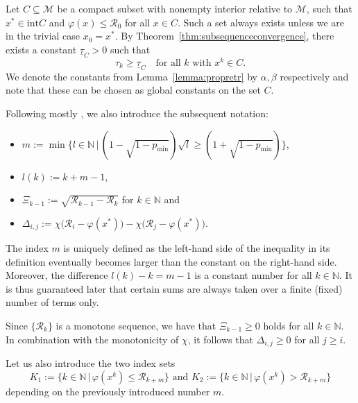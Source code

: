 \documentclass[a4paper, 12pt]{article}
\numberwithin{equation}{section}
\theoremstyle{bolddef}
\theoremstyle{definition}
\theoremstyle{boldplain}
\newcommand{\xk}{x^k}
\newcommand{\tauk}{\tau_k}
\newcommand{\taug}{\underline{\tau}}
\newcommand{\N}{\mathbb{N}}
\newcommand{\Rvalue}{\mathcal{R}}
\begin{document}
Let $C \subseteq \mathcal{M}$ be a compact subset with nonempty interior relative to $\mathcal{M}$, such that $x^* \in \mathrm{int} C$ and $\varphi(x) \leq \Rvalue_0$ for all $x \in C$. Such a set always exists unless we are in the trivial case $x_0 = x^*$. By Theorem~\ref{thm:subsequenceconvergence}, there exists a constant $\taug_C > 0$ 
such that 
\begin{equation}\label{eq:taucbounded}
   \tauk \geq \taug_C \quad \text{for all } k
   \text{ with } \xk \in C.
\end{equation}
We denote the constants from Lemma~\ref{lemma:propretr} by $\alpha, \beta$ respectively and note that these can be chosen as global constants on the set $C$.

Following mostly \cite{Qian2024}, we also introduce
the subsequent notation: 
\begin{itemize}
	\item $m := \min \big\{ l \in \N \, \big| \, (1-\sqrt{1-p_{\min}}) \sqrt{l} \geq (1+\sqrt{1-p_{\min}}) \big\} $,
	\item $l(k) := k + m - 1$, 
	\item $\Xi_{k-1} := \sqrt{\Rvalue_{k-1} - \Rvalue_{k}}$ for $k \in \N $
	   and
	\item $\Delta_{i, j} := \chi \big(\Rvalue_i- \varphi(x^*) \big) - 
	   \chi \big( \Rvalue_j - \varphi(x^*) \big)$.
\end{itemize}
The index $m$ is uniquely defined as the 
left-hand side of the inequality in its definition eventually becomes larger than
the constant on the right-hand side. Moreover, 
the difference $ l(k)- k = m-1 $ is a constant number for all $ k \in \N $.
It is thus guaranteed later that certain
sums are always taken over a finite (fixed) number of terms only. 

Since $\{\Rvalue_k\}$ is a monotone sequence, we have that $\Xi_{k-1} \geq 0$ holds for all $ k \in \N $.
In combination with the monotonicity of $\chi$, it follows that $\Delta_{i,j} \geq 0$ for all $j \geq i$.

Let us also introduce the two index sets
\begin{equation*}
	K_1 := \big\{ k \in \N \, \big| \, \varphi(\xk) \leq \Rvalue_{k+m}
	\big\} \text{\ and\ } K_2 := \big\{k \in \N \, \big| \, \varphi(\xk) > \Rvalue_{k+m} \big\}
\end{equation*}
depending on the previously introduced number $ m $.
\end{document}
